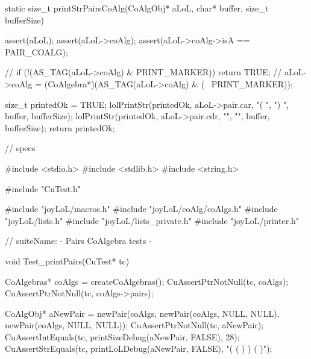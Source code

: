 static size_t printStrPairsCoAlg(CoAlgObj* aLoL,
                                 char* buffer, size_t bufferSize) {
  assert(aLoL);
  assert(aLoL->coAlg);
  assert(aLoL->coAlg->isA == PAIR_COALG);

//  if (!(AS_TAG(aLoL->coAlg) & PRINT_MARKER)) return TRUE;
//  aLoL->coAlg = (CoAlgebra*)(AS_TAG(aLoL->coAlg) & (~ PRINT_MARKER));

  size_t printedOk = TRUE;
  lolPrintStr(printedOk, aLoL->pair.car, "( ", ") ", buffer, bufferSize);
  lolPrintStr(printedOk, aLoL->pair.cdr, "", "", buffer, bufferSize);
  return printedOk;
}
\stoptyping

\starttyping
// specs

#include <stdio.h>
#include <stdlib.h>
#include <string.h>

#include "CuTest.h"

#include "joyLoL/macros.h"
#include "joyLoL/coAlg/coAlgs.h"
#include "joyLoL/lists.h"
#include "joyLoL/lists_private.h"
#include "joyLoL/printer.h"

// suiteName: - Pairs CoAlgebra tests -

void Test_printPairs(CuTest* tc) {
  CoAlgebras* coAlgs = createCoAlgebras();
  CuAssertPtrNotNull(tc, coAlgs);
  CuAssertPtrNotNull(tc, coAlgs->pairs);

  CoAlgObj* aNewPair = newPair(coAlgs,
                               newPair(coAlgs, NULL, NULL),
                               newPair(coAlgs, NULL, NULL));
  CuAssertPtrNotNull(tc, aNewPair);
  CuAssertIntEquals(tc, printSizeDebug(aNewPair, FALSE), 28);
  CuAssertStrEquals(tc, printLoLDebug(aNewPair, FALSE), "( ( ) ) ( )");
}
\stoptyping
